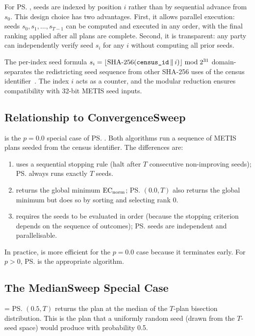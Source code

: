 For \ps{}, seeds are indexed by position $i$ rather than by sequential
advance from $s_0$.
This design choice has two advantages.
First, it allows parallel execution: seeds $s_0, s_1, \ldots, s_{T-1}$
can be computed and executed in any order, with the final ranking applied
after all plans are complete.
Second, it is transparent: any party can independently verify seed $s_i$
for any $i$ without computing all prior seeds.

The per-index seed formula $s_i = \lfloor \text{SHA-256}(\texttt{census\_id}
\,\|\, i) \rfloor \bmod 2^{31}$ domain-separates the redistricting seed sequence
from other SHA-256 uses of the census identifier~\citep{sha256nist}.
The index $i$ acts as a counter, and the modular reduction ensures
compatibility with 32-bit METIS seed inputs.

\subsection{Relationship to ConvergenceSweep}

\cs{} is the $p = 0.0$ special case of \ps{}.
Both algorithms run a sequence of METIS plans seeded from the census
identifier.
The differences are:
\begin{enumerate}
\item \cs{} uses a sequential stopping rule (halt after $T$ consecutive
      non-improving seeds); \ps{} always runs exactly $T$ seeds.
\item \cs{} returns the global minimum $\mathrm{EC}_{\mathrm{norm}}$; \ps{}$(0.0, T)$ also
      returns the global minimum but does so by sorting and selecting rank 0.
\item \cs{} requires the seeds to be evaluated in order (because the stopping
      criterion depends on the sequence of outcomes); \ps{} seeds are
      independent and parallelisable.
\end{enumerate}

In practice, \cs{} is more efficient for the $p = 0.0$ case because it
terminates early.
For $p > 0$, \ps{} is the appropriate algorithm.

\subsection{The MedianSweep Special Case}

\ms{} = \ps{}$(0.5, T)$ returns the plan at the median of the
$T$-plan bisection distribution.
This is the plan that a uniformly random seed (drawn from the $T$-seed
space) would produce with probability 0.5.

